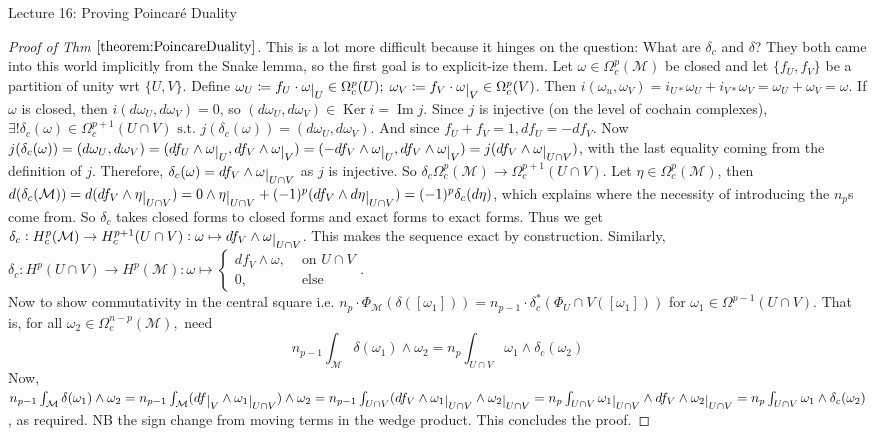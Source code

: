 \documentclass[10pt]{article}
\theoremstyle{plain}
\theoremstyle{definition}
\newcommand{\st}{\text{ s.t. }}
\newcommand{\man}{\mathcal{M}}
\newcommand{\compactpformman}[1]{\Omega^{#1}_c(\man)}
\newcommand{\deriv}{d}
\newcommand{\df}{df}
\newcommand{\dw}{d\omega}
\newcommand{\deta}{\deriv\eta}
\def\restrict#1{\raise-.5ex\hbox{\ensuremath|}_{#1}}
\DeclareMathOperator{\Ker}{Ker}
\DeclareMathOperator{\Ima}{Im}
\newcommand{\cohomman}[1]{H^{#1}(\man)}
\newcommand{\compactcohomman}[1]{H_c^{#1}(\man)}
\newcommand{\UintV}{U\cap V}
\begin{document}
\begin{section}{Lecture 16: Proving Poincar\'e Duality}
\begin{proof}[Proof of Thm $\ref{theorem:PoincareDuality}$]
This is a lot more difficult because it hinges on the question: What are $\delta_c$ and $\delta$? They both came into this world implicitly from the Snake lemma, so the first goal is to explicit-ize them. Let $\omega\in \compactpformman{p} $ be closed and let $\{f_U,f_V\}$ be a partition of unity wrt $\{U,V\}$. Define $\omega_U \coloneqq f_U \cdot \omega\restrict{U} \in \Omega_c^p(U) ;\;  \omega_V \coloneqq f_V \cdot \omega\restrict{V} \in \Omega_c^p(V) $. Then $i(\omega_u,\omega_V) = i_{U*}\omega_U + i_{V*}\omega_V = \omega_U + \omega_V = \omega.$ If $\omega$ is closed, then $i(\dw_U,\dw_V) = 0$, so $(\dw_U,\dw_V) \in \Ker i = \Ima j$. Since $j$ is injective (on the level of cochain complexes), $\exists ! \delta_c(\omega) \in \Omega_c^{p+1} (\UintV) \st j(\delta_c(\omega)) = (\dw_U,\dw_V)$. And since $f_U + f_V = 1, \df_U = -\df_V$. Now $j(\delta_c(\omega)) = (\dw_U,\dw_V) = (\df_U \wedge \omega\restrict{U} , \df_V\wedge \omega\restrict{V}) = (-\df_V \wedge \omega\restrict{U} , \df_V\wedge \omega\restrict{V}) = j(\df_V \wedge \omega\restrict{\UintV})$, with the last equality coming from the definition of $j$. Therefore, $\delta_c(\omega) = \df_V \wedge \omega\restrict{\UintV}$ as $j$ is injective. So $\delta_c \Omega_c^p(\man) \to \Omega_c^{p+1}(\UintV).$ Let $\eta \in \Omega_c^p(\man)$, then $\deriv(\delta_c(\man)) = \deriv(\df_V \wedge \eta\restrict{\UintV}) = 0 \wedge \eta\restrict{\UintV} + (-1)^p (\df_V \wedge \deta \restrict{\UintV}) = (-1)^p\delta_c(\deta)$, which explains where the necessity of introducing the $n_p$s come from. So $\delta_c$ takes closed forms to closed forms and exact forms to exact forms. Thus we get $\delta_c : \compactcohomman{p} \to H^{p+1}_c(\UintV) : \omega\mapsto \df_V \wedge \omega\restrict{\UintV} $. This makes the sequence exact by construction. Similarly, $\delta_c : H^p(\UintV) \to \cohomman{p} : \omega \mapsto \begin{cases} \df_V\wedge \omega,& \text{ on } \UintV \\ 0, & \text{ else}\end{cases}$.
\\
Now to show commutativity in the central square i.e. $n_p \cdot \Phi_\man ( \delta([\omega_1])) = n_{p-1}\cdot \delta_c^* (\Phi_\UintV([\omega_1]))$ for $\omega_1 \in \Omega^{p-1}(\UintV)$. That is, for all $\omega_2 \in \Omega_c^{n-p}(\man),$ need 
$$
n_{p-1} \int_\man \delta(\omega_1) \wedge \omega_2 = n_p \int_{\UintV} \omega_1 \wedge \delta_c(\omega_2)
$$
Now, $n_{p-1} \int_\man \delta(\omega_1)\wedge\omega_2 = n_{p-1} \int_\man (\df\restrict{V} \wedge \omega_1 \restrict{\UintV}) \wedge\omega_2 = n_{p-1} \int_{\UintV} (\df_V \wedge \omega_1 \restrict{\UintV} \wedge \omega_2 \restrict{\UintV} = n_p \int_{\UintV} \omega_1 \restrict{\UintV} \wedge \df _V \wedge \omega_2 \restrict{\UintV} = n_p \int_{\UintV} \omega_1 \wedge \delta_c(\omega_2)$, as required. NB the sign change from moving terms in the wedge product. This concludes the proof.

\end{proof}
\end{section}
\end{document}
